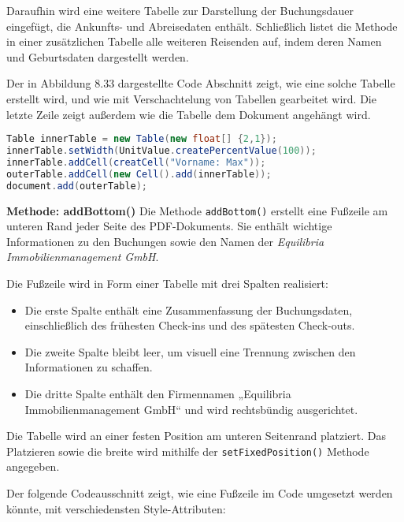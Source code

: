 	\vspace{3mm} 
	
	\noindent Daraufhin wird eine weitere Tabelle zur Darstellung der Buchungsdauer eingefügt, die Ankunfts- und Abreisedaten enthält. Schließlich listet die Methode in einer zusätzlichen Tabelle alle weiteren Reisenden auf, indem deren Namen und Geburtsdaten dargestellt werden. 
	
	
	\noindent Der in Abbildung 8.33 dargestellte Code Abschnitt zeigt, wie eine solche Tabelle erstellt wird, und wie mit Verschachtelung von Tabellen gearbeitet wird. Die letzte Zeile zeigt außerdem wie die Tabelle dem Dokument angehängt wird.
	
	
\begin{lstlisting}[language=Java, caption={Code-Ausschnitt: Verschachtelung.}]
Table innerTable = new Table(new float[] {2,1});
innerTable.setWidth(UnitValue.createPercentValue(100));
innerTable.addCell(creatCell("Vorname: Max"));
outerTable.addCell(new Cell().add(innerTable));
document.add(outerTable);
\end{lstlisting}
	
	\newpage
	\noindent \textbf{Methode: addBottom()}\vspace{3mm}\newline
	\noindent Die Methode \texttt{addBottom()} erstellt eine Fußzeile am unteren Rand jeder Seite des PDF-Dokuments. Sie enthält wichtige Informationen zu den Buchungen sowie den Namen der \textit{Equilibria Immobilienmanagement GmbH}.
	
	\vspace{3mm}
	\noindent Die Fußzeile wird in Form einer Tabelle mit drei Spalten realisiert:
	\begin{itemize}
		\item Die erste Spalte enthält eine Zusammenfassung der Buchungsdaten, einschließlich des frühesten Check-ins und des spätesten Check-outs.
		\item Die zweite Spalte bleibt leer, um visuell eine Trennung zwischen den Informationen zu schaffen.
		\item Die dritte Spalte enthält den Firmennamen „Equilibria Immobilienmanagement GmbH“ und wird rechtsbündig ausgerichtet.
	\end{itemize}
	
	\noindent Die Tabelle wird an einer festen Position am unteren Seitenrand platziert. Das Platzieren sowie die breite wird mithilfe der \texttt{setFixedPosition()} Methode angegeben. 
	
	\vspace{3mm}
	\noindent Der folgende Codeausschnitt zeigt, wie eine Fußzeile im Code umgesetzt werden könnte, mit verschiedensten Style-Attributen:
    
